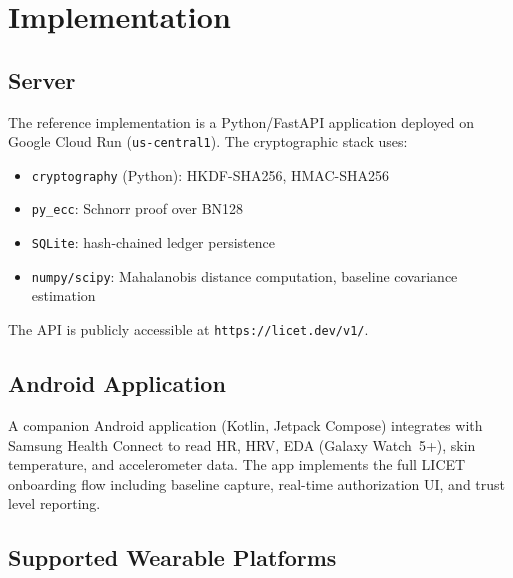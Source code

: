 \documentclass[12pt,a4paper]{article}
\begin{document}
\section{Implementation}

\subsection{Server}

The reference implementation is a Python/FastAPI application deployed on Google
Cloud Run (\texttt{us-central1}). The cryptographic stack uses:

\begin{itemize}
  \item \texttt{cryptography} (Python): HKDF-SHA256, HMAC-SHA256
  \item \texttt{py\_ecc}: Schnorr proof over BN128
  \item \texttt{SQLite}: hash-chained ledger persistence
  \item \texttt{numpy/scipy}: Mahalanobis distance computation, baseline
  covariance estimation
\end{itemize}

The API is publicly accessible at \texttt{https://licet.dev/v1/}.

\subsection{Android Application}

A companion Android application (Kotlin, Jetpack Compose) integrates with
Samsung Health Connect to read HR, HRV, EDA (Galaxy Watch~5+), skin
temperature, and accelerometer data. The app implements the full LICET
onboarding flow including baseline capture, real-time authorization UI, and
trust level reporting.

\subsection{Supported Wearable Platforms}
\end{document}
